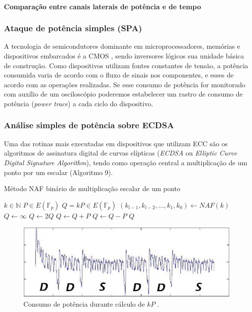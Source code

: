\paragraph{Comparação entre canais laterais de potência e de tempo}

\subsubsection{Ataque de potência simples (SPA)}
A tecnologia de semicondutores dominante em microprocessadores, mem\'{o}rias e dispositivos embarcados \'{e} a CMOS   \cite{sedra:1997}, sendo inversores l\'{o}gicos sua unidade b\'{a}sica de constru\c{c}\~{a}o. Como dispositivos utilizam fontes constantes de tens\~{a}o, a pot\^{e}ncia consumida varia de acordo com o fluxo de sinais nos componentes, e esses de acordo com as opera\c{c}\~{o}es realizadas. Se esse consumo de pot\^{e}ncia for monitorado com aux\'{i}lio de um oscilosc\'{o}pio poderemos estabelecer um rastro de consumo de pot\^{e}ncia (\textit{power trace}) a cada ciclo do dispositivo.

\subsubsection{An\'{a}lise simples de pot\^{e}ncia sobre ECDSA}
Uma das rotinas mais executadas em dispositivos que utilizam ECC s\~{a}o os algoritmos de assinatura digital de curvas el\'{i}pticas (\textit{ECDSA} ou \textit{Elliptic Curve Digital Signature Algorithm}), tendo como opera\c{c}\~{a}o central a multiplica\c{c}\~{a}o de um ponto por um escalar (Algoritmo 9).

\begin{algorithm}[H]
\caption{M\'{e}todo NAF bin\'{a}rio de multiplica\c{c}\~{a}o escalar de um ponto}
\begin{algorithmic}
    \REQUIRE $k \in \mathbb{N}$
    \REQUIRE $P \in E(\mathbb{F}_p)$
    \ENSURE $Q = kP \in E(\mathbb{F}_p)$
    \STATE $(k_{l-1}, k_{l-2}, ..., k_{1}, k_{0}) \leftarrow NAF(k)$
    \STATE $Q \leftarrow \infty$
        \STATE $Q \leftarrow 2Q$
            \STATE $Q \leftarrow Q + P$
        \ENDIF
            \STATE $Q \leftarrow Q - P$
        \ENDIF
    \ENDFOR
    \RETURN $Q$
    \end{algorithmic}
\end{algorithm}

\begin{figure}[ht]
	\centering
	\includegraphics[width=.8\textwidth]{figures/spa1.jpg}
	\caption{Consumo de pot\^{e}ncia durante c\'{a}lculo de $kP$ \cite{ECCBook_HankersonVanstone2004}.}
	\label{fig:Fig5}
\end{figure}

